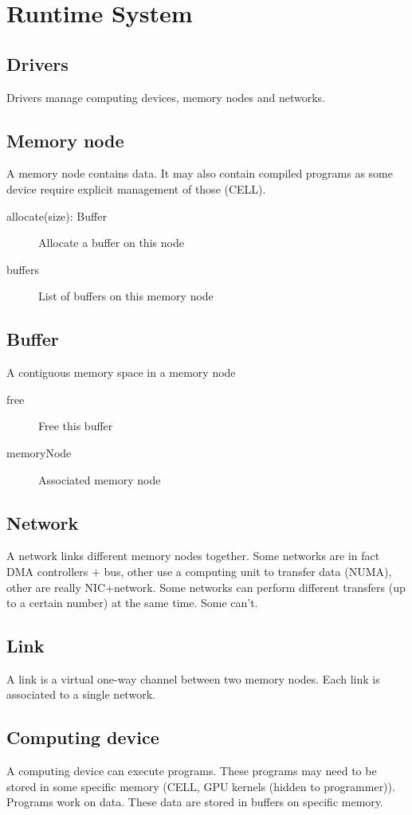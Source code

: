 \chapter{Runtime System}

\section{Drivers}
Drivers manage computing devices, memory nodes and networks.


\section{Memory node}
A memory node contains data.
It may also contain compiled programs as some device require explicit management of those (CELL).

\begin{description}
  \item[allocate(size): Buffer] Allocate a buffer on this node
  \item[buffers] List of buffers on this memory node
\end{description}


\section{Buffer}
A contiguous memory space in a memory node

\begin{description}
  \item[free] Free this buffer
  \item[memoryNode] Associated memory node
\end{description}


\section{Network}
A network links different memory nodes together.
Some networks are in fact DMA controllers + bus, other use a computing unit to transfer data (NUMA), other are really NIC+network. 
Some networks can perform different transfers (up to a certain number) at the same time. Some can't.


\section{Link}
A link is a virtual one-way channel between two memory nodes. Each link is associated to a single network.


\section{Computing device}
A computing device can execute programs. These programs may need to be stored in some specific memory (CELL, GPU kernels (hidden to programmer)).
Programs work on data. These data are stored in buffers on specific memory.


